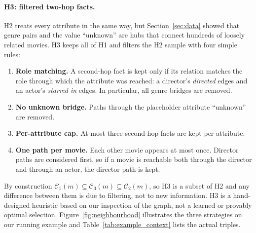 \documentclass[a4paper,11pt]{article}
\begin{document}
\paragraph{H3: filtered two-hop facts.} H2 treats every attribute in the same way, but Section~\ref{sec:data} showed that genre pairs and the value ``unknown'' are hubs that connect hundreds of loosely related movies. H3 keeps all of H1 and filters the H2 sample with four simple rules:
\begin{enumerate}
    \item \textbf{Role matching.} A second-hop fact is kept only if its relation matches the role through which the attribute was reached: a director's \textit{directed} edges and an actor's \textit{starred in} edges. In particular, all genre bridges are removed.
    \item \textbf{No unknown bridge.} Paths through the placeholder attribute ``unknown'' are removed.
    \item \textbf{Per-attribute cap.} At most three second-hop facts are kept per attribute.
    \item \textbf{One path per movie.} Each other movie appears at most once. Director paths are considered first, so if a movie is reachable both through the director and through an actor, the director path is kept.
\end{enumerate}
By construction $\mathcal{C}_1(m)\subseteq\mathcal{C}_3(m)\subseteq\mathcal{C}_2(m)$, so H3 is a subset of H2 and any difference between them is due to filtering, not to new information. H3 is a hand-designed heuristic based on our inspection of the graph, not a learned or provably optimal selection. Figure~\ref{fig:neighbourhood} illustrates the three strategies on our running example and Table~\ref{tab:example_context} lists the actual triples.
\end{document}
